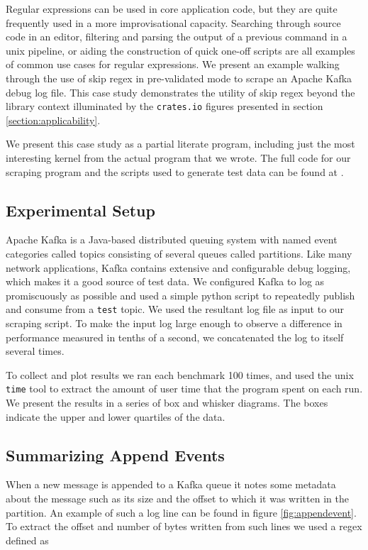 Regular expressions can be used in core application code, but they
are quite frequently used in a more improvisational capacity.
Searching through source code in an editor, filtering and parsing
the output of a previous command in a unix pipeline, or aiding
the construction of quick one-off scripts are all examples of
common use cases for regular expressions. We present an example
walking through the use of skip regex in pre-validated mode
to scrape an Apache Kafka debug log file. This case study
demonstrates the utility of skip regex beyond the library context
illuminated by the \verb'crates.io' figures presented in section
\ref{section:applicability}.

We present this case study as a partial literate program,
including just the most interesting kernel from the actual
program that we wrote. The full code for our scraping program
and the scripts used to generate test data can be found at
\cite{PailesSkipRegexCaseStudy}.

\subsection{Experimental Setup}

Apache Kafka is a Java-based distributed queuing system with
named event categories called topics consisting of several
queues called partitions. Like many network applications,
Kafka contains extensive and configurable debug logging,
which makes it a good source of test data. We configured
Kafka to log as promiscuously as possible and used a simple
python script to repeatedly publish and consume from a 
\verb'test' topic. We used the resultant log file as input
to our scraping script. To make the input log large enough
to observe a difference in performance measured in tenths of
a second, we concatenated the log to itself several times.

To collect and plot results we ran each benchmark 100
times, and used the unix \verb'time' tool to extract
the amount of user time that the program spent on each
run. We present the results in a series of box and whisker
diagrams. The boxes indicate the upper and lower quartiles
of the data.

\subsection{Summarizing Append Events}

When a new message is appended to a Kafka queue it notes some
metadata about the message such as its size and the offset to
which it was written in the partition. An example of such a log
line can be found in figure \ref{fig:appendevent}. To extract
the offset and number of bytes written from such lines we
used a regex defined as

